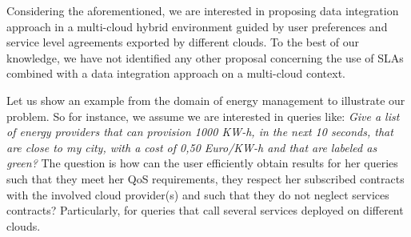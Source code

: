 \documentclass[12pt,a4paper,oneside]{report}
\begin{document}
Considering the aforementioned, we are interested in proposing data integration approach in a multi-cloud hybrid environment guided by user preferences and service level agreements exported by different clouds. To the best of our knowledge, we have not identified any other proposal concerning the use of SLAs combined with a data integration approach on a multi-cloud context.




Let us show an example from the domain of energy management to illustrate our problem. So for instance, we assume we are interested in queries like: \textit{Give a list of energy providers that can provision 1000 KW-h, in the next 10 seconds, that are close to my city, with a cost of 0,50 Euro/KW-h and that are labeled as green?} The question is how can the user efficiently obtain results for her queries such that they meet her QoS requirements, they respect her subscribed contracts with the involved cloud provider(s) and such that they do not neglect services contracts? Particularly, for queries that call several services deployed on different clouds.
\end{document}
